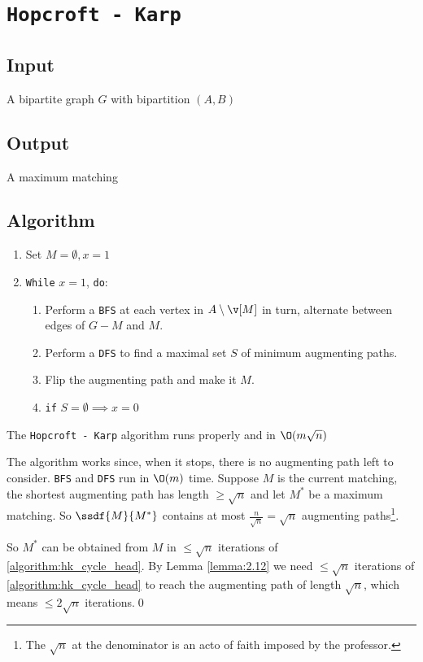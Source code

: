 \section{\texttt{Hopcroft - Karp}}
\subsection{Input}
    A bipartite graph $G$ with bipartition $(A, B)$
\subsection{Output}
    A maximum matching
\subsection{Algorithm}
\begin{enumerate}
    \item Set $M = \emptyset, x = 1$
    \item \label{algorithm:hk_cycle_head}\texttt{While} $x = 1$, \texttt{do}:
    \begin{enumerate}[label = \Alph*]
        \item Perform a \texttt{BFS} at each vertex in $A \setminus \v[M]$ in turn, alternate between edges of $G - M$ and $M$.
        \item Perform a \texttt{DFS} to find a maximal set $S$ of minimum augmenting paths.
        \item Flip the augmenting path and make it $M$.
        \item \texttt{if} $S = \emptyset \implies x = 0$
    \end{enumerate}
\end{enumerate}
\begin{customlemma}{2.13}
\label{lemma:2.13}
    The \texttt{Hopcroft - Karp} algorithm runs properly and in $\O(m\sqrt{n})$
\end{customlemma}
\begin{prf}
    The algorithm works since, when it stops, there is no augmenting path left to consider. \texttt{BFS} and \texttt{DFS} run in $\O(m)$ time. Suppose $M$ is the current matching, the shortest augmenting path has length $\geq \sqrt{n}$ and let $M^*$ be a maximum matching. So $\ssdf{M}{M^*}$ contains at most $\frac{n}{\sqrt{n}} = \sqrt{n}$ augmenting paths\footnote{The $\sqrt{n}$ at the denominator is an acto of faith imposed by the professor.}.

    So $M^*$ can be obtained from $M$ in $\leq \sqrt{n}$ iterations of \ref{algorithm:hk_cycle_head}. By Lemma \ref{lemma:2.12} we need $\leq \sqrt{n}$ iterations of \ref{algorithm:hk_cycle_head} to reach the augmenting path of length $\sqrt{n}$, which means $\leq 2\sqrt{n}$ iterations.\qed
\end{prf}